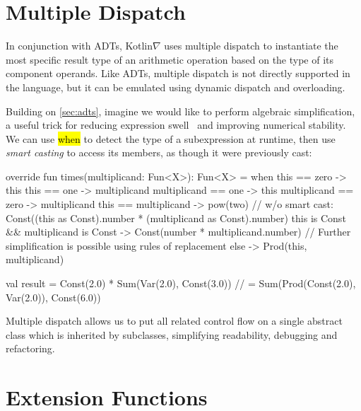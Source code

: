 \documentclass[12pt,initial,twoside,maitrise]{dms}
\newcommand{\inline}[1]{%
    \begingroup%
    \sethlcolor{slightgray}%
    \hl{\ttfamily\small #1}%
    \endgroup
}
\numberwithin{equation}{section}
\numberwithin{table}{chapter}
\numberwithin{figure}{chapter}
\begin{document}
\section{Multiple Dispatch}\label{sec:multiple-dispatch}

In conjunction with ADTs, Kotlin$\nabla$ uses multiple dispatch to instantiate the most specific result type of an arithmetic operation based on the type of its component operands. Like ADTs, multiple dispatch is not directly supported in the language, but it can be emulated using dynamic dispatch and overloading.

Building on \autoref{sec:adts}, imagine we would like to perform algebraic simplification, a useful trick for reducing expression swell~\citep{laue2019equivalence} and improving numerical stability. We can use \inline{when} to detect the type of a subexpression at runtime, then use \textit{smart casting} to access its members, as though it were previously cast:

\begin{kotlinlisting}
override fun times(multiplicand: Fun<X>): Fun<X> =
    when {
        this == zero -> this
        this == one -> multiplicand
        multiplicand == one -> this
        multiplicand == zero -> multiplicand
        this == multiplicand -> pow(two)
        // w/o smart cast: Const((this as Const).number * (multiplicand as Const).number)
        this is Const && multiplicand is Const -> Const(number * multiplicand.number)
        // Further simplification is possible using rules of replacement
        else -> Prod(this, multiplicand)
    }

val result = Const(2.0) * Sum(Var(2.0), Const(3.0))
//         = Sum(Prod(Const(2.0), Var(2.0)), Const(6.0))
\end{kotlinlisting}
%
Multiple dispatch allows us to put all related control flow on a single abstract class which is inherited by subclasses, simplifying readability, debugging and refactoring.

\section{Extension Functions}\label{sec:extension-functions}
\end{document}
